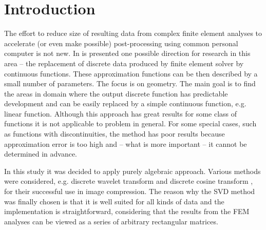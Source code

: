 \section{Introduction}
\label{sec:introduction}


The effort to reduce size of resulting data from complex finite element analyses to accelerate (or even make possible) post-processing using common personal computer is not new. In \cite{Benes2016} is presented one possible direction for research in this area -- the replacement of discrete data produced by finite element solver by continuous functions. These approximation functions can be then described by a small number of parameters. The focus is on geometry. The main goal is to find the areas in domain where the output discrete function has predictable development and can be easily replaced by a simple continuous function, e.g. linear function. Although this approach has great results for some class of functions it is not applicable to problem in general. For some special cases, such as functions with discontinuities, the method has poor results because approximation error is too high and -- what is more important -- it cannot be determined in advance.

In this study it was decided to apply purely algebraic approach. Various methods were considered, e.g. discrete wavelet transform \cite{Lui2001} and discrete cosine transform \cite{Watson1994}, for their successful use in image compression. The reason why the SVD method was finally chosen is that it is well suited for all kinds of data and the implementation is straightforward, considering that the results from the FEM analyses can be viewed as a series of arbitrary rectangular matrices.

